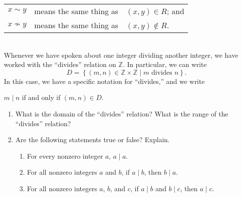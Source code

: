 \label{sym:xtwiddley} 
\begin{center}
\begin{tabular}{c l l}
$x \sim y$  &  means the same thing as  &  $\left( {x, y} \right) \in R$; and \\
$x \nsim y$  &  means the same thing as  &  $\left( {x, y} \right) \notin R$.  \\
\end{tabular}
\end{center}
%
\hbreak
%
\begin{prog} \label{prog:dividesrelation} \hfill \\
Whenever we have spoken about one integer dividing another integer, we have worked with the ``divides''
%
%
 relation on  $\mathbb{Z}$.  In particular, we can write
\[
D = \left\{ { {\left( {m, n} \right) \in \mathbb{Z} \times \mathbb{Z} } \mid m\text{  divides  }n} \right\}\!.
\]
In this case, we have a specific notation for ``divides,'' and we write
\begin{center}
$m \mid n$ \quad if and only if  \quad $\left( {m, n} \right) \in D$.
\end{center}

\begin{enumerate}
\item What is the domain of the ``divides'' relation?  What is the range of the ``divides'' relation?

\item Are the following statements true or false?  Explain.

\begin{enumerate}
    \item For every  nonzero integer $a$, $a \mid a$.

    \item For all nonzero integers $a$ and $b$, if  $a \mid b$, then  $b \mid a$.

    \item For all  nonzero integers $a$, $b$, and $c$,  if  $a \mid b$ and   $b \mid c$, then  
     $a \mid c$.

\end{enumerate}
\end{enumerate}
\end{prog}
\hbreak

\endinput
